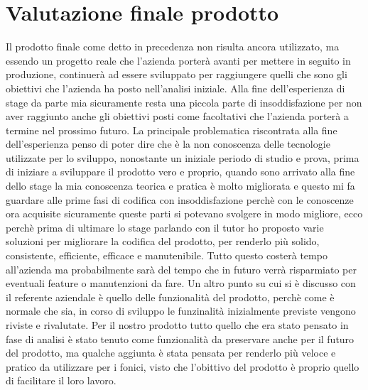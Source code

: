 \section{Valutazione finale prodotto}
\label{sec:valutazione-finale-prodotto}
Il prodotto finale come detto in precedenza non risulta ancora utilizzato, ma essendo un progetto reale che l'azienda porterà avanti per mettere in seguito in produzione, continuerà ad
essere sviluppato per raggiungere quelli che sono gli obiettivi che l'azienda ha posto nell'analisi iniziale. Alla fine dell'esperienza di stage da parte mia sicuramente resta una piccola parte
di insoddisfazione per non aver raggiunto anche gli obiettivi posti come facoltativi che l'azienda porterà a termine nel prossimo futuro. La principale problematica riscontrata alla fine
dell'esperienza penso di poter dire che è la non conoscenza delle tecnologie utilizzate per lo sviluppo, nonostante un iniziale periodo di studio e prova, prima di iniziare a sviluppare
il prodotto vero e proprio, quando sono arrivato alla fine dello stage la mia conoscenza teorica e pratica è molto migliorata e questo mi fa guardare alle prime fasi di codifica con
insoddisfazione perchè con le conoscenze ora acquisite sicuramente queste parti si potevano svolgere in modo migliore, ecco perchè prima di ultimare lo stage parlando con il tutor ho
proposto varie soluzioni per migliorare la codifica del prodotto, per renderlo più solido, consistente, efficiente, efficace e manutenibile. Tutto questo costerà tempo all'azienda ma
probabilmente sarà del tempo che in futuro verrà risparmiato per eventuali feature o manutenzioni da fare. Un altro punto su cui si è discusso con il referente aziendale è quello delle
funzionalità del prodotto, perchè come è normale che sia, in corso di sviluppo le funzinalità inizialmente previste vengono riviste e rivalutate. Per il nostro prodotto tutto quello
che era stato pensato in fase di analisi è stato tenuto come funzionalità da preservare anche per il futuro del prodotto, ma qualche aggiunta è stata pensata per renderlo più veloce e
pratico da utilizzare per i fonici, visto che l'obittivo del prodotto è proprio quello di facilitare il loro lavoro.

